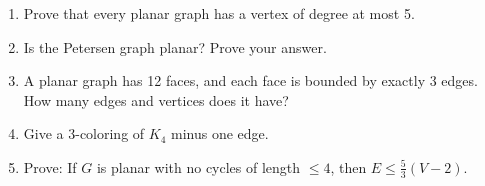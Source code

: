 \begin{enumerate}
  \item Prove that every planar graph has a vertex of degree at most 5.

  \item Is the Petersen graph planar? Prove your answer.

  \item A planar graph has 12 faces, and each face is bounded by exactly 3 edges. How many edges and vertices does it have?

  \item Give a 3-coloring of $K_4$ minus one edge.

  \item Prove: If $G$ is planar with no cycles of length $\leq 4$, then $E \leq \frac{5}{3}(V - 2)$.
\end{enumerate}
